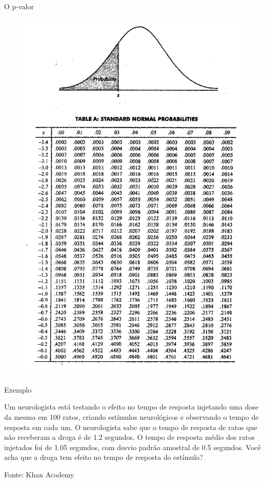 \documentclass{beamer}
\begin{document}
\begin{frame}{O p-valor}
  \begin{figure}
    \centering
      \includegraphics[height=0.9\textheight]{z_table}
  \end{figure}
\end{frame}
  
\begin{frame}{Exemplo}
  \begin{example}
    Um neurologista está testando o efeito no tempo de resposta
    injetando uma dose da mesma em \alert{100} ratos, criando
    estímulos neurológicos e observando o tempo de resposta em cada
    um. O neurologista sabe que o tempo de resposta de ratos que não
    receberam a droga é de \alert{1.2 segundos}. O tempo de resposta
    médio dos ratos injetados foi de \alert{1.05 segundos}, com desvio
    padrão amostral de \alert{0.5 segundos}. Você acha que a droga tem
    efeito no tempo de resposta do estímulo?
  \end{example}
Fonte: Khan Academy
\end{frame}
\end{document}

